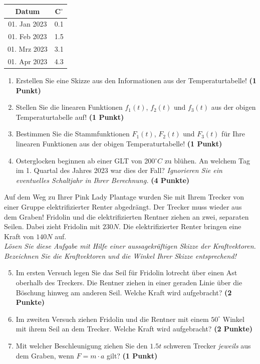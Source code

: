 \documentclass[a4paper, 9pt]{scrartcl}\usepackage[]{graphicx}\usepackage[]{xcolor}
\begin{document}
\begin{center}
\begin{tabular}{cc}
  \toprule
  Datum & C$^\circ$ \\
  \midrule
  01. Jan 2023 & 0.1\\
  01. Feb 2023 & 1.5\\
  01. Mrz 2023 & 3.1\\
  01. Apr 2023 & 4.3\\
  \bottomrule
\end{tabular}
\end{center}

\begin{enumerate}
\item Erstellen Sie eine Skizze aus den Informationen aus der
  Temperaturtabelle!  \textbf{(1 Punkt)}
\item Stellen Sie die linearen Funktionen $f_1(t)$, $f_2(t)$ und
  $f_3(t)$ aus der obigen Temperaturtabelle auf!  \textbf{(1 Punkt)}
\item Bestimmen Sie die Stammfunktionen $F_1(t)$, $F_2(t)$ und $F_3(t)$ f{\"u}r
  Ihre linearen Funktionen aus der obigen Temperaturtabelle!  \textbf{(1
    Punkt)}
\item Osterglocken beginnen ab einer GLT von 200$^\circ C$ zu bl{\"u}hen. An
  welchem Tag im 1. Quartal des Jahres 2023 war dies der
  Fall? \textit{Ignorieren Sie ein eventuelles Schaltjahr in Ihrer Berechnung.} \textbf{(4 Punkte)}
\end{enumerate}

Auf dem Weg zu Ihrer Pink Lady Plantage wurden Sie mit Ihrem Trecker von
einer Gruppe elektrifizierter Renter abgedr{\"a}ngt. Der Trecker muss wieder
aus dem Graben! Fridolin und die elektrifizierten Rentner ziehen an zwei,
separaten Seilen. Dabei zieht Fridolin mit $230N$. Die
elektrifizierter Renter  bringen eine Kraft von $140N$ auf.\\

\textit{L{\"o}sen Sie diese Aufgabe mit Hilfe einer aussagekr{\"a}ftigen Skizze der
  Kraftvektoren. Bezeichnen Sie die Kraftvektoren und die Winkel Ihrer
  Skizze entsprechend!}

\begin{enumerate}
  \setcounter{enumi}{4}  
\item Im ersten Versuch legen Sie das Seil f{\"u}r Fridolin lotrecht {\"u}ber einen
  Ast oberhalb des Treckers. Die Rentner ziehen in einer geraden Linie {\"u}ber
  die B{\"o}schung hinweg am anderen Seil. Welche Kraft wird aufgebracht?
  \textbf{(2 Punkte)}
\item Im zweiten Versuch ziehen Fridolin und die Rentner mit einem
  $50^\circ$ Winkel mit ihrem Seil an dem Trecker. Welche Kraft
  wird aufgebracht? \textbf{(2 Punkte)}
\item Mit welcher Beschleunigung ziehen Sie den $1.5t$ schweren
  Trecker \textit{jeweils} aus dem Graben, wenn $F = m \cdot a$ gilt?
  \textbf{(1 Punkt)}
\end{enumerate}
\end{document}
